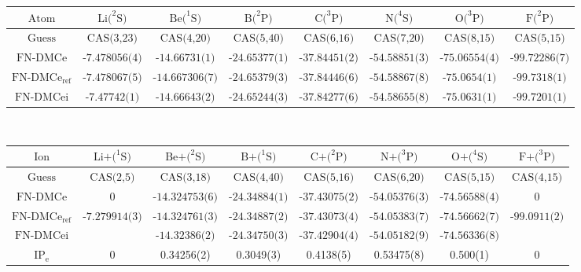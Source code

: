 \documentclass[aps,prl,superscriptaddress,groupedaddress]{revtex4}
\begin{document}
\begin{table*}[htp!]
\setlength{\extrarowheight}{3pt}
\begin{tabular}{*{1}{*{8}{c}}}
\hline\hline
$\text{Atom}$ & $\text{Li}(^2\text{S)}$ & $\text{Be}(^1\text{S)}$ & $\text{B}(^2\text{P)}$ & $\text{C}(^3\text{P)}$ & $\text{N}(^4\text{S)}$ & $\text{O}(^3\text{P)}$ & $\text{F}(^2\text{P)}$ \\ \hline
$\text{Guess}$ & $\text{CAS(3,23)}$ & $\text{CAS(4,20)}$ & $\text{CAS(5,40)}$ & $\text{CAS(6,16)}$ & $\text{CAS(7,20)}$ & $\text{CAS(8,15)}$ & $\text{CAS(5,15)}$ \\
$\text{FN-DMCe}$ & $\text{-7.478056(4)}$ & $\text{-14.66731(1)}$ & $\text{-24.65377(1)}$ & $\text{-37.84451(2)}$ & $\text{-54.58851(3)}$ & $\text{-75.06554(4)}$ & $\text{-99.72286(7)}$ \\
$\text{FN-DMCe}_{\text{ref}}$ & $\text{-7.478067(5)}$ & $\text{-14.667306(7)}$ & $\text{-24.65379(3)}$ & $\text{-37.84446(6)}$ & $\text{-54.58867(8)}$ & $\text{-75.0654(1)}$ & $\text{-99.7318(1)}$ \\
$\text{FN-DMCei}$ & $\text{-7.47742(1)}$ & $\text{-14.66643(2)}$ & $\text{-24.65244(3)}$ & $\text{-37.84277(6)}$ & $\text{-54.58655(8)}$ & $\text{-75.0631(1)}$ & $\text{-99.7201(1)}$ \\
\hline
\end{tabular} \\ 
\begin{tabular}{*{1}{*{8}{c}}}
$\text{Ion}$ & $\text{Li+}(^1\text{S)}$ & $\text{Be+}(^2\text{S)}$ & $\text{B+}(^1\text{S)}$ & $\text{C+}(^2\text{P)}$ & $\text{N+}(^3\text{P)}$ & $\text{O+}(^4\text{S)}$ & $\text{F+}(^3\text{P)}$ \\ \hline
$\text{Guess}$ & $\text{CAS(2,5)}$ & $\text{CAS(3,18)}$ & $\text{CAS(4,40)}$ & $\text{CAS(5,16)}$ & $\text{CAS(6,20)}$ & $\text{CAS(5,15)}$ & $\text{CAS(4,15)}$ \\
$\text{FN-DMCe}$ & $0$ & $\text{-14.324753(6)}$ & $\text{-24.34884(1)}$ & $\text{-37.43075(2)}$ & $\text{-54.05376(3)}$ & $\text{-74.56588(4)}$ & $0$ \\
$\text{FN-DMCe}_{\text{ref}}$ & $\text{-7.279914(3)}$ & $\text{-14.324761(3)}$ & $\text{-24.34887(2)}$ & $\text{-37.43073(4)}$ & $\text{-54.05383(7)}$ & $\text{-74.56662(7)}$ & $\text{-99.0911(2)}$ \\
$\text{FN-DMCei}$ & $\text{}$ & $\text{-14.32386(2)}$ & $\text{-24.34750(3)}$ & $\text{-37.42904(4)}$ & $\text{-54.05182(9)}$ & $\text{-74.56336(8)}$ & $\text{}$ \\
\hline
$\text{IP}_{\text{e}}$  & 0 & 0.34256(2) & 0.3049(3) & 0.4138(5) & 0.53475(8) & 0.500(1) & 0 \\

\end{tabular}
\end{table*}
\end{document}

